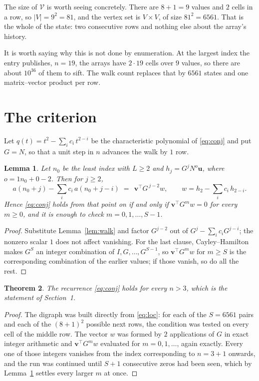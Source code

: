 \documentclass[11pt,a4paper]{article}
\theoremstyle{plain}
\newtheorem{theorem}{Theorem}
\newtheorem{lemma}[theorem]{Lemma}
\theoremstyle{definition}
\begin{document}
The size of $\mathcal V$ is worth seeing concretely. There are $8+1=9$ values
and $2$ cells in a row, so $|V|=9^{2}=81$, and the vertex set is
$V\times V$, of size $81^2=6561$. That is the whole of the state: two consecutive
rows and nothing else about the array's history.

It is worth saying why this is not done by enumeration. At the largest index the entry
publishes, $n=19$, the arrays have $2\cdot19$ cells over
$9$ values, so there are about $10^{36}$ of them to sift. The
walk count replaces that by $6561$ states and one matrix--vector product per row.
\section{The criterion}

Let $q(t)=t^{2}-\sum_i c_i\,t^{2-i}$ be the characteristic polynomial of
\eqref{eq:conj} and put $G=N$, so that a unit step in $n$ advances the walk by
$1$ row.

\begin{lemma}\label{lem:crit}
Let $n_0$ be the least index with $L\ge2$ and $h_j=G^{j}N^{o}\mathbf{u}$, where
$o=1n_0+0-2$. Then for $j\ge2$,
\[
a(n_0+j)-\sum_i c_i\,a(n_0+j-i)\;=\;\,\mathbf{v}^{\!\top}G^{\,j-2}w,
\qquad w=h_{2}-\sum_i c_i\,h_{2-i} .
\]
Hence \eqref{eq:conj} holds from that point on if and only if
$\mathbf{v}^{\!\top}G^{m}w=0$ for every $m\ge0$, and it is enough to check
$m=0,1,\dots,S-1$.
\end{lemma}

\begin{proof}
Substitute Lemma~\ref{lem:walk} and factor $G^{j-2}$ out of
$G^{j}-\sum_ic_iG^{j-i}$; the nonzero scalar $1$ does not affect
vanishing. For the last clause, Cayley--Hamilton makes $G^{S}$ an integer combination of
$I,G,\dots,G^{S-1}$, so $\mathbf{v}^{\!\top}G^{m}w$ for $m\ge S$ is the corresponding
combination of the earlier values; if those vanish, so do all the rest.
\end{proof}

\begin{theorem}
The recurrence \eqref{eq:conj} holds for every $n>3$, which is the statement of
Section~1.
\end{theorem}

\begin{proof}
The digraph was built directly from \eqref{eq:loc}: for each of the $S=6561$ pairs and each
of the $(8+1)^{2}$ possible next rows, the condition was tested on every cell of
the middle row. The vector $w$ was formed by $2$ applications of $G$ in exact integer
arithmetic and $\mathbf{v}^{\!\top}G^{m}w$ evaluated for $m=0,1,\dots$, again exactly.
Every one of those integers vanishes from the index corresponding to $n=3+1$ onwards,
and the run was continued until $S+1$ consecutive zeros had been seen, which by
Lemma~\ref{lem:crit} settles every larger $m$ at once.
\end{proof}
\end{document}
